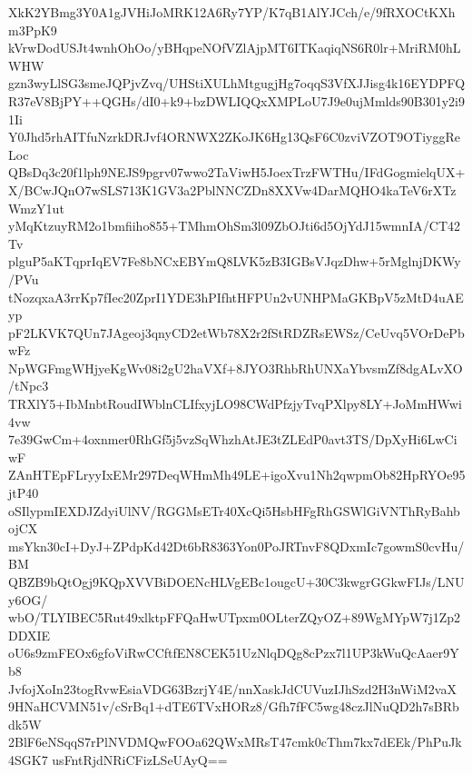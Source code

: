 XkK2YBmg3Y0A1gJVHiJoMRK12A6Ry7YP/K7qB1AlYJCch/e/9fRXOCtKXhm3PpK9
kVrwDodUSJt4wnhOhOo/yBHqpeNOfVZlAjpMT6ITKaqiqNS6R0lr+MriRM0hLWHW
gzn3wyLlSG3smeJQPjvZvq/UHStiXULhMtgugjHg7oqqS3VfXJJisg4k16EYDPFQ
R37eV8BjPY++QGHs/dI0+k9+bzDWLIQQxXMPLoU7J9e0ujMmlds90B301y2i91Ii
Y0Jhd5rhAITfuNzrkDRJvf4ORNWX2ZKoJK6Hg13QsF6C0zviVZOT9OTiyggReLoc
QBsDq3c20f1lph9NEJS9pgrv07wwo2TaViwH5JoexTrzFWTHu/IFdGogmielqUX+
X/BCwJQnO7wSLS713K1GV3a2PblNNCZDn8XXVw4DarMQHO4kaTeV6rXTzWmzY1ut
yMqKtzuyRM2o1bmfiiho855+TMhmOhSm3l09ZbOJti6d5OjYdJ15wmnIA/CT42Tv
plguP5aKTqprIqEV7Fe8bNCxEBYmQ8LVK5zB3IGBsVJqzDhw+5rMglnjDKWy/PVu
tNozqxaA3rrKp7fIec20ZprI1YDE3hPIfhtHFPUn2vUNHPMaGKBpV5zMtD4uAEyp
pF2LKVK7QUn7JAgeoj3qnyCD2etWb78X2r2fStRDZRsEWSz/CeUvq5VOrDePbwFz
NpWGFmgWHjyeKgWv08i2gU2haVXf+8JYO3RhbRhUNXaYbvsmZf8dgALvXO/tNpc3
TRXlY5+IbMnbtRoudIWblnCLIfxyjLO98CWdPfzjyTvqPXlpy8LY+JoMmHWwi4vw
7e39GwCm+4oxnmer0RhGf5j5vzSqWhzhAtJE3tZLEdP0avt3TS/DpXyHi6LwCiwF
ZAnHTEpFLryyIxEMr297DeqWHmMh49LE+igoXvu1Nh2qwpmOb82HpRYOe95jtP40
oSIlypmIEXDJZdyiUlNV/RGGMsETr40XcQi5HsbHFgRhGSWlGiVNThRyBahbojCX
msYkn30cI+DyJ+ZPdpKd42Dt6bR8363Yon0PoJRTnvF8QDxmIc7gowmS0cvHu/BM
QBZB9bQtOgj9KQpXVVBiDOENcHLVgEBc1ougcU+30C3kwgrGGkwFIJs/LNUy6OG/
wbO/TLYIBEC5Rut49xlktpFFQaHwUTpxm0OLterZQyOZ+89WgMYpW7j1Zp2DDXIE
oU6s9zmFEOx6gfoViRwCCftfEN8CEK51UzNlqDQg8cPzx7l1UP3kWuQcAaer9Yb8
JvfojXoIn23togRvwEsiaVDG63BzrjY4E/nnXaskJdCUVuzIJhSzd2H3nWiM2vaX
9HNaHCVMN51v/cSrBq1+dTE6TVxHORz8/Gfh7fFC5wg48czJlNuQD2h7sBRbdk5W
2BlF6eNSqqS7rPlNVDMQwFOOa62QWxMRsT47cmk0cThm7kx7dEEk/PhPuJk4SGK7
usFntRjdNRiCFizLSeUAyQ==

